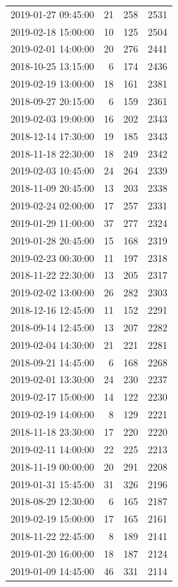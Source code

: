 \begin{tabular}{lrrr}
2019-01-27 09:45:00 & 21 & 258 & 2531 \\
2019-02-18 15:00:00 & 10 & 125 & 2504 \\
2019-02-01 14:00:00 & 20 & 276 & 2441 \\
2018-10-25 13:15:00 & 6 & 174 & 2436 \\
2019-02-19 13:00:00 & 18 & 161 & 2381 \\
2018-09-27 20:15:00 & 6 & 159 & 2361 \\
2019-02-03 19:00:00 & 16 & 202 & 2343 \\
2018-12-14 17:30:00 & 19 & 185 & 2343 \\
2018-11-18 22:30:00 & 18 & 249 & 2342 \\
2019-02-03 10:45:00 & 24 & 264 & 2339 \\
2018-11-09 20:45:00 & 13 & 203 & 2338 \\
2019-02-24 02:00:00 & 17 & 257 & 2331 \\
2019-01-29 11:00:00 & 37 & 277 & 2324 \\
2019-01-28 20:45:00 & 15 & 168 & 2319 \\
2019-02-23 00:30:00 & 11 & 197 & 2318 \\
2018-11-22 22:30:00 & 13 & 205 & 2317 \\
2019-02-02 13:00:00 & 26 & 282 & 2303 \\
2018-12-16 12:45:00 & 11 & 152 & 2291 \\
2018-09-14 12:45:00 & 13 & 207 & 2282 \\
2019-02-04 14:30:00 & 21 & 221 & 2281 \\
2018-09-21 14:45:00 & 6 & 168 & 2268 \\
2019-02-01 13:30:00 & 24 & 230 & 2237 \\
2019-02-17 15:00:00 & 14 & 122 & 2230 \\
2019-02-19 14:00:00 & 8 & 129 & 2221 \\
2018-11-18 23:30:00 & 17 & 220 & 2220 \\
2019-02-11 14:00:00 & 22 & 225 & 2213 \\
2018-11-19 00:00:00 & 20 & 291 & 2208 \\
2019-01-31 15:45:00 & 31 & 326 & 2196 \\
2018-08-29 12:30:00 & 6 & 165 & 2187 \\
2019-02-19 15:00:00 & 17 & 165 & 2161 \\
2018-11-22 22:45:00 & 8 & 189 & 2141 \\
2019-01-20 16:00:00 & 18 & 187 & 2124 \\
2019-01-09 14:45:00 & 46 & 331 & 2114 \\

\end{tabular}

